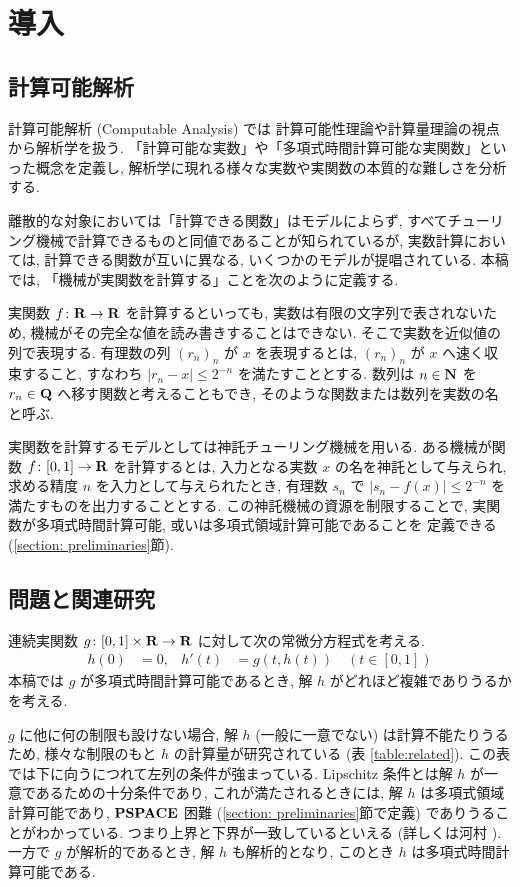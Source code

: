 \section{導入}

\subsection{計算可能解析}

計算可能解析 (Computable Analysis) \cite{weihrauch00:_comput_analy} では
計算可能性理論や計算量理論の視点から解析学を扱う. 
「計算可能な実数」や「多項式時間計算可能な実関数」といった概念を定義し, 
解析学に現れる様々な実数や実関数の本質的な難しさを分析する. 

離散的な対象においては「計算できる関数」はモデルによらず,
すべてチューリング機械で計算できるものと同値であることが知られているが,
実数計算においては, 計算できる関数が互いに異なる, いくつかのモデルが提唱されている.
本稿では,
「機械が実関数を計算する」ことを次のように定義する.

実関数 $f \colon \mathbf R \to \mathbf R$ を計算するといっても,
実数は有限の文字列で表されないため,
機械がその完全な値を読み書きすることはできない.
そこで実数を近似値の列で表現する.
有理数の列 $(r_n)_n$ が $x$ を表現するとは,
$(r_n)_n$ が $x$ へ速く収束すること, 
すなわち $|r_n - x| \le 2^{-n}$ を満たすこととする.
数列は $n \in \mathbf N$ を $r_n \in \mathbf Q$ へ移す関数と考えることもでき,
そのような関数または数列を実数の名と呼ぶ.

実関数を計算するモデルとしては神託チューリング機械を用いる. 
ある機械が関数 $f \colon [0, 1] \to \mathbf R$ を計算するとは,
入力となる実数 $x$ の名を神託として与えられ,
求める精度 $n$ を入力として与えられたとき,
有理数 $s_n$ で $|s_n - f(x)| \le 2^{-n}$ を満たすものを出力することとする.
この神託機械の資源を制限することで, 
実関数が多項式時間計算可能, 或いは多項式領域計算可能であることを
定義できる (\ref{section: preliminaries}節).

\subsection{問題と関連研究}

連続実関数 $g \colon [0,1] \times \mathbf R \to \mathbf R$ に対して次の常微分方程式を考える. 
\begin{align}
 \label{eq:ode}
 h(0) & = 0, &
 h'(t) & = g(t,h(t)) \quad (t \in [0,1])
\end{align}
本稿では $g$ が多項式時間計算可能であるとき, 
解 $h$ がどれほど複雑でありうるかを考える.

$g$ に他に何の制限も設けない場合, 解 $h$ (一般に一意でない) は計算不能たりうるため,
様々な制限のもと $h$ の計算量が研究されている (表 \ref{table:related}).
この表では下に向うにつれて左列の条件が強まっている. 
Lipschitz 条件とは解 $h$ が一意であるための十分条件であり, 
これが満たされるときには, 解 $h$ は多項式領域計算可能であり, 
${\bf PSPACE}$ 困難 (\ref{section: preliminaries}節で定義) でありうることがわかっている. 
つまり上界と下界が一致しているといえる (詳しくは河村 \cite{kawamura2010lipschitz}).
一方で $g$ が解析的であるとき, 解 $h$ も解析的となり, 
このとき $h$ は多項式時間計算可能である.

